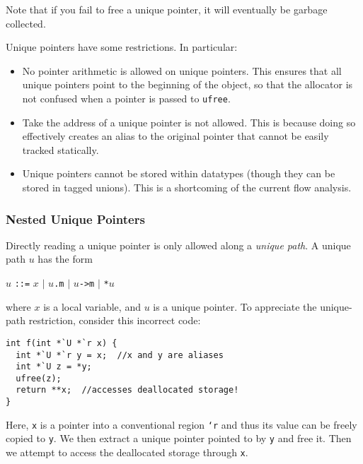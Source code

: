 Note that if you fail to free a unique pointer, it will eventually be
garbage collected.

Unique pointers have some restrictions.  In particular:
\begin{itemize}
\item No pointer arithmetic is allowed on unique pointers.  This ensures
  that all unique pointers point to the beginning of the object, so that the
  allocator is not confused when a pointer is passed to \texttt{ufree}.
\item Take the address of a unique pointer is not allowed.  This is because
  doing so effectively creates an alias to the original pointer that cannot
  be easily tracked statically.
\item Unique pointers cannot be stored within datatypes (though they can be
  stored in tagged unions).  This is a shortcoming of the current flow
  analysis.
\end{itemize}

\subsubsection{Nested Unique Pointers}

Directly reading a unique pointer is only allowed along a \emph{unique
path}.  A unique path $u$ has the form
\begin{center}
$u$ \texttt{::=} $x$ $\mid$ $u$\texttt{.m} $\mid$ $u$\texttt{->m} $\mid$ \texttt{*}$u$
\end{center}
where $x$ is a local variable, and $u$ is a unique pointer.  To
appreciate the unique-path restriction, consider this incorrect code:
\begin{verbatim}
int f(int *`U *`r x) {
  int *`U *`r y = x;  //x and y are aliases
  int *`U z = *y;
  ufree(z);
  return **x;  //accesses deallocated storage!
}
\end{verbatim}
Here, \texttt{x} is a pointer into a conventional region \texttt{`r} and
thus its value can be freely copied to \texttt{y}.  We then extract a unique
pointer pointed to by \texttt{y} and free it.  Then we attempt to access the
deallocated storage through \texttt{x}.

